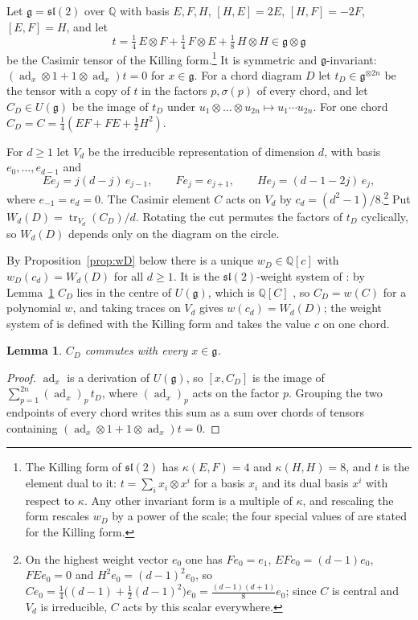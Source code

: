 \documentclass[11pt,a4paper,reqno]{amsart}
\newtheorem{lemma}[theorem]{Lemma}
\theoremstyle{definition}
\newcommand{\Q}{\mathbb{Q}}
\newcommand{\g}{\mathfrak{g}}
\newcommand{\slt}{\mathfrak{sl}(2)}
\newcommand{\Ue}{U(\g)}
\newcommand{\tr}{\operatorname{tr}}
\begin{document}
Let $\g=\slt$ over $\Q$ with basis $E,F,H$, $[H,E]=2E$, $[H,F]=-2F$, $[E,F]=H$, and let
\[
t=\tfrac14\,E\otimes F+\tfrac14\,F\otimes E+\tfrac18\,H\otimes H\in\g\otimes\g
\]
be the Casimir tensor of the Killing form.\footnote{The Killing form of $\slt$ has $\kappa(E,F)=4$ and $\kappa(H,H)=8$, and $t$ is the element dual to it: $t=\sum_i x_i\otimes x^i$ for a basis $x_i$ and its dual basis $x^i$ with respect to $\kappa$. Any other invariant form is a multiple of $\kappa$, and rescaling the form rescales $w_D$ by a power of the scale; the four special values of \cite{FKPU} are stated for the Killing form.} It is symmetric and $\g$-invariant: $(\operatorname{ad}_x\otimes1+1\otimes\operatorname{ad}_x)t=0$ for $x\in\g$. For a chord diagram $D$ let $t_D\in\g^{\otimes 2n}$ be the tensor with a copy of $t$ in the factors $p,\sigma(p)$ of every chord, and let $C_D\in\Ue$ be the image of $t_D$ under $u_1\otimes\dots\otimes u_{2n}\mapsto u_1\cdots u_{2n}$. For one chord $C_D=C=\frac14(EF+FE+\frac12H^2)$.

For $d\ge1$ let $V_d$ be the irreducible representation of dimension $d$, with basis $e_0,\dots,e_{d-1}$ and
\[
Ee_j=j(d-j)\,e_{j-1},\qquad Fe_j=e_{j+1},\qquad He_j=(d-1-2j)\,e_j,
\]
where $e_{-1}=e_d=0$.
The Casimir element $C$ acts on $V_d$ by $c_d=(d^2-1)/8$.\footnote{On the highest weight vector $e_0$ one has $Fe_0=e_1$, $EFe_0=(d-1)e_0$, $FEe_0=0$ and $H^2e_0=(d-1)^2e_0$, so $Ce_0=\frac14\bigl((d-1)+\frac12(d-1)^2\bigr)e_0=\frac{(d-1)(d+1)}{8}e_0$; since $C$ is central and $V_d$ is irreducible, $C$ acts by this scalar everywhere.} Put $W_d(D)=\tr_{V_d}(C_D)/d$. Rotating the cut permutes the factors of $t_D$ cyclically, so $W_d(D)$ depends only on the diagram on the circle.

By Proposition~\ref{prop:wD} below there is a unique $w_D\in\Q[c]$ with $w_D(c_d)=W_d(D)$ for all $d\ge1$. It is the $\slt$-weight system of \cite{ChV97,FKPU}: by Lemma~\ref{lem:central} $C_D$ lies in the centre of $\Ue$, which is $\Q[C]$ \cite{Hum08}, so $C_D=w(C)$ for a polynomial $w$, and taking traces on $V_d$ gives $w(c_d)=W_d(D)$; the weight system of \cite{FKPU} is defined with the Killing form and takes the value $c$ on one chord.

\begin{lemma}\label{lem:central}
$C_D$ commutes with every $x\in\g$.
\end{lemma}

\begin{proof}
$\operatorname{ad}_x$ is a derivation of $\Ue$, so $[x,C_D]$ is the image of $\sum_{p=1}^{2n}(\operatorname{ad}_x)_p\,t_D$, where $(\operatorname{ad}_x)_p$ acts on the factor $p$. Grouping the two endpoints of every chord writes this sum as a sum over chords of tensors containing $(\operatorname{ad}_x\otimes1+1\otimes\operatorname{ad}_x)t=0$.
\end{proof}
\end{document}
